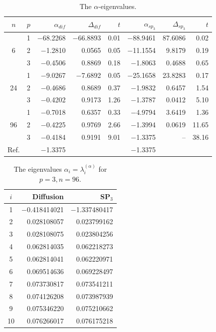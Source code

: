 \documentclass[a4paper]{jpconf}
\begin{document}
\begin{table}[h]
\caption{The $\alpha$-eigenvalues.}
\label{tab:iaea_with_alpha_del}
\begin{center}
\begin{tabular}{c c r r r r r r}
\hline
$n$ & $p$ & $\alpha_{dif}$ & $\Delta_{dif}$ &$t$ &$\alpha_{sp_3}$& $\Delta_{sp_3}$&$t$ \\
\hline
	& 1	&$-$68.2268 &$-$66.8893& 0.01& $-$88.9461 &87.6086 &0.02\\
6	& 2	& $-$1.2810 & 0.0565& 0.05& $-$11.1554 & 9.8179 &0.19\\
	& 3	& $-$0.4506 & 0.8869& 0.18& $-$1.8063 & 0.4688 &0.65\\ 
\hline
	& 1	& $-$9.0267  &$-$7.6892& 0.05& $-$25.1658 &23.8283 &0.17\\
24& 2	& $-$0.4686  & 0.8689& 0.37& $-$1.9832 & 0.6457 &1.54\\
	& 3	& $-$0.4202  & 0.9173& 1.26& $-$1.3787 & 0.0412 &5.10\\ 
\hline
	& 1	& $-$0.7018  & 0.6357& 0.33& $-$4.9794 & 3.6419 &1.36\\
96& 2	& $-$0.4225  & 0.9769& 2.66& $-$1.3994 & 0.0619 &11.65\\
	& 3	& $-$0.4184  & 0.9191& 9.01& $-$1.3375 &    -- &38.16\\ 
\hline
Ref.&   & $-$1.3375  &       &     & $-$1.3375 \\ 
\hline
\end{tabular}
\end{center}
\end{table}

\begin{table}[h]
\caption{The eigenvalues $\alpha_i=\lambda_i^{(\alpha)}$ for $p=3, n=96$.}
\label{tab:iaea_with_alpha_del_10}
\begin{center}
\begin{tabular}{c r r}
\hline
$i$ & Diffusion & SP$_3$ \\
\hline
1& $-$0.418414021 &$-$1.337480417\\
2& 0.028108057    &   0.023799162\\
3& 0.028108075    &   0.023804256\\
4& 0.062814035    &   0.062218273\\
5& 0.062814041    &   0.062220971\\
6& 0.069514636    &   0.069228497\\
7& 0.073730817    &   0.073541211\\
8& 0.074126208    &   0.073987939\\
9& 0.075346220    &   0.075210662\\
10& 0.076266017   &   0.076175218\\
\hline
\end{tabular}
\end{center}
\end{table}
\end{document}
